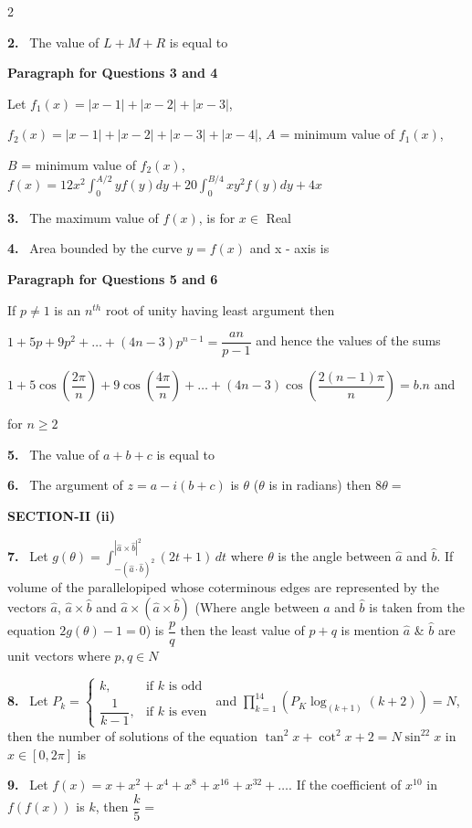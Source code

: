 \documentclass[10pt]{extarticle}
\newcommand{\sect}[1]{\par\smallskip\noindent\textbf{#1}\par}
\newcommand{\qn}[1]{\par\smallskip\noindent\textbf{#1.}~}
\newcommand{\paraq}[2]{\par\smallskip\noindent\textbf{Paragraph for Questions #1 and #2}\par}
\begin{document}
\begin{multicols}{2}
\qn{2} The value of $L+M+R$ is equal to
\paraq{3}{4}Let $f_1(x)=|x-1|+|x-2|+|x-3|$,\par $f_2(x)=|x-1|+|x-2|+|x-3|+|x-4|$, $A$ = minimum value of $f_1(x)$,\par
$B$ = minimum value of $f_2(x)$, $f(x)=12x^2\displaystyle\int_0^{A/2}yf(y)dy+20\int_0^{B/4}xy^2f(y)dy+4x$
\qn{3} The maximum value of $f(x)$, is for $x\in$ Real\underline{\hspace{1.5cm}}
\qn{4} Area bounded by the curve $y=f(x)$ and x - axis is \underline{\hspace{1.5cm}}
\paraq{5}{6}If $p\neq1$ is an $n^{th}$ root of unity having least argument then\par
$1+5p+9p^2+\ldots+(4n-3)p^{n-1}=\dfrac{an}{p-1}$ and hence the values of the sums\par
$1+5\cos\left(\dfrac{2\pi}{n}\right)+9\cos\left(\dfrac{4\pi}{n}\right)+\ldots+(4n-3)\cos\left(\dfrac{2(n-1)\pi}{n}\right)=b.n$ and\par
{}\par for $n\ge2$
\qn{5} The value of $a+b+c$ is equal to \underline{\hspace{1.5cm}}
\qn{6} The argument of $z=a-i(b+c)$ is $\theta$ ($\theta$ is in radians) then $8\theta=$ \underline{\hspace{1.5cm}}
\sect{SECTION-II (ii)}
\qn{7} Let $g(\theta)=\displaystyle\int_{-(\hat a\cdot\hat b)^2}^{|\hat a\times\hat b|^2}(2t+1)\,dt$ where $\theta$ is the angle between $\hat a$ and $\hat b$. If volume of the parallelopiped whose coterminous edges are represented by the vectors $\hat a$, $\hat a\times\hat b$ and $\hat a\times\left(\hat a\times\hat b\right)$ (Where angle between $\hat a$ and $\hat b$ is taken from the equation $2g(\theta)-1=0$) is $\dfrac pq$ then the least value of $p+q$ is \underline{\hspace{1cm}} mention $\hat a$ \& $\hat b$ are unit vectors where $p,q\in N$
\qn{8} Let $P_k=\begin{cases}k,&\text{if }k\text{ is odd}\\[2pt]\dfrac{1}{k-1},&\text{if }k\text{ is even}\end{cases}$ and $\displaystyle\prod_{k=1}^{14}\left(P_K\log_{(k+1)}(k+2)\right)=N$, then the number of solutions of the equation $\tan^2x+\cot^2x+2=N\sin^22x$ in $x\in[0,2\pi]$ is \underline{\hspace{1.5cm}}
\qn{9} Let $f(x)=x+x^2+x^4+x^8+x^{16}+x^{32}+\ldots.$ If the coefficient of $x^{10}$ in $f(f(x))$ is $k$, then $\dfrac k5=$ \underline{\hspace{1cm}}
\end{multicols}
\end{document}
